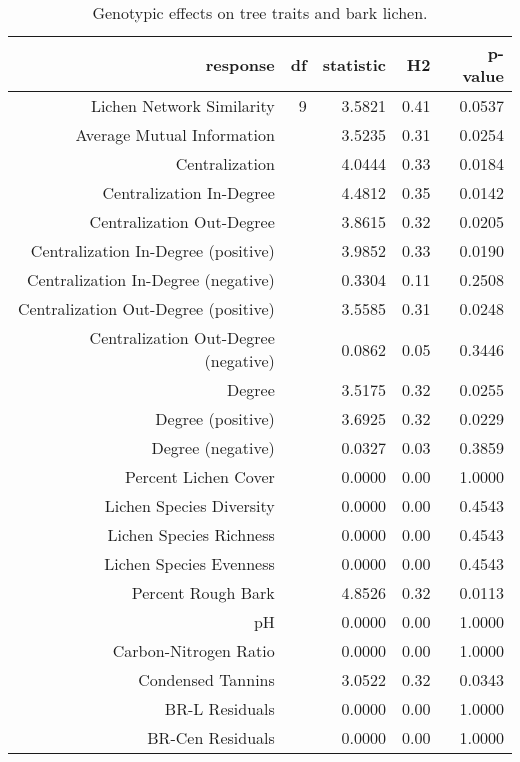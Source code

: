 
\begin{table}[ht]
\centering
\begin{tabular}{rrrrr}
  \hline
response & df & statistic & H2 & p-value \\ 
  \hline
Lichen Network Similarity & 9 & 3.5821 & 0.41 & 0.0537 \\ 
  Average Mutual Information &  & 3.5235 & 0.31 & 0.0254 \\ 
  Centralization &  & 4.0444 & 0.33 & 0.0184 \\ 
  Centralization In-Degree &  & 4.4812 & 0.35 & 0.0142 \\ 
  Centralization Out-Degree &  & 3.8615 & 0.32 & 0.0205 \\ 
  Centralization In-Degree (positive) &  & 3.9852 & 0.33 & 0.0190 \\ 
  Centralization In-Degree (negative) &  & 0.3304 & 0.11 & 0.2508 \\ 
  Centralization Out-Degree (positive) &  & 3.5585 & 0.31 & 0.0248 \\ 
  Centralization Out-Degree (negative) &  & 0.0862 & 0.05 & 0.3446 \\ 
  Degree &  & 3.5175 & 0.32 & 0.0255 \\ 
  Degree (positive) &  & 3.6925 & 0.32 & 0.0229 \\ 
  Degree (negative) &  & 0.0327 & 0.03 & 0.3859 \\ 
  Percent Lichen Cover &  & 0.0000 & 0.00 & 1.0000 \\ 
  Lichen Species Diversity &  & 0.0000 & 0.00 & 0.4543 \\ 
  Lichen Species Richness &  & 0.0000 & 0.00 & 0.4543 \\ 
  Lichen Species Evenness &  & 0.0000 & 0.00 & 0.4543 \\ 
  Percent Rough Bark &  & 4.8526 & 0.32 & 0.0113 \\ 
  pH &  & 0.0000 & 0.00 & 1.0000 \\ 
  Carbon-Nitrogen Ratio &  & 0.0000 & 0.00 & 1.0000 \\ 
  Condensed Tannins &  & 3.0522 & 0.32 & 0.0343 \\ 
  BR-L Residuals &  & 0.0000 & 0.00 & 1.0000 \\ 
  BR-Cen Residuals &  & 0.0000 & 0.00 & 1.0000 \\ 
   \hline
\end{tabular}
\caption{Genotypic effects on tree traits and bark lichen.} 
\label{tab:h2_table}
\end{table}

